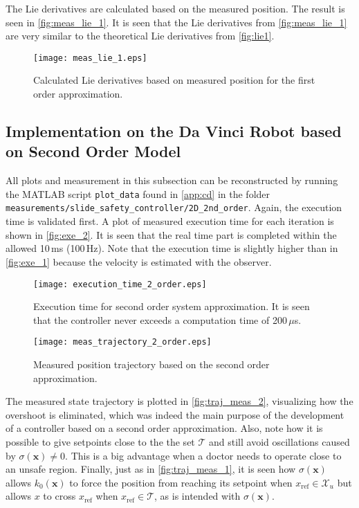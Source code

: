 The Lie derivatives are calculated based on the measured position. The result is seen in \autoref{fig:meas_lie_1}.
It is seen that the Lie derivatives from \autoref{fig:meas_lie_1} are very similar to the theoretical Lie derivatives from \autoref{fig:lie1}.

\begin{figure}[htbp]
\hspace{-3mm}
		\texttt{[image: meas\_lie\_1.eps]}
	\caption{Calculated Lie derivatives based on measured position for the first order approximation. }
    \label{fig:meas_lie_1}
\end{figure}


\subsection{Implementation on the Da Vinci Robot based on Second Order Model}\label{subsec-implement-2dmodel}
\vspace{-1mm}
All plots and measurement in this subsection can be reconstructed by running the MATLAB script \texttt{plot\_data} found in \autoref{app:cd} in the folder \texttt{measurements/slide\_safety\_controller/2D\_2nd\_order}. Again, the execution time is validated first. A plot of measured execution time for each iteration is shown in \autoref{fig:exe_2}.
It is seen that the real time part is completed within the allowed 10\,ms (100\,Hz). Note that the execution time is slightly higher than in \autoref{fig:exe_1} because the velocity is estimated with the observer.


\begin{figure}[htbp]
	\center
		\texttt{[image: execution\_time\_2\_order.eps]}
	\caption{Execution time for second order system approximation. It is seen that the controller never exceeds a computation time of 200\,$\mu$s.}
	\label{fig:exe_2}
\end{figure}



\vspace{-3mm}
\begin{figure}[H]
	\center
		\texttt{[image: meas\_trajectory\_2\_order.eps]}
	\caption{Measured position trajectory based on the second order approximation.}
    \label{fig:traj_meas_2}
\end{figure}
The measured state trajectory is plotted in \autoref{fig:traj_meas_2}, visualizing how the overshoot is eliminated, which was indeed the main purpose of the development of a controller based on a second order approximation. Also, note how it is possible to give setpoints close to the the set $\mathcal{T}$ and still avoid oscillations caused by $\sigma(\mathbf{x})\neq 0$. This is a big advantage when a doctor needs to operate close to an unsafe region. Finally, just as in \autoref{fig:traj_meas_1}, it is seen how $\sigma(\mathbf{x})$ allows $k_0(\mathbf{x})$ to force the position from reaching its setpoint when $x_\text{ref} \in \mathcal{X}_u$ but allows $x$ to cross $x_\text{ref}$ when $x_\text{ref} \in \mathcal{T}$, as is intended with $\sigma(\mathbf{x})$.

